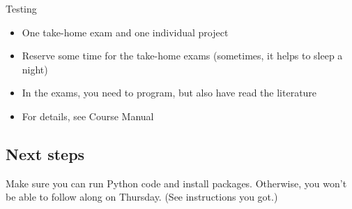 \begin{frame}{Testing}
\begin{itemize}
	\item One take-home exam and one individual project
	\item Reserve some time for the take-home exams (sometimes, it helps to sleep a night)
	\item In the exams, you need to program, but also have read the literature
	\item For details, see Course Manual
\end{itemize}
\end{frame}


\subsection{Next steps}


\begin{frame}[standout]
	Make sure you can run Python code and install packages. Otherwise, you won't be able to follow along on Thursday. (See instructions you got.)
\end{frame}


\begin{frame}
	\printbibliography
\end{frame}



